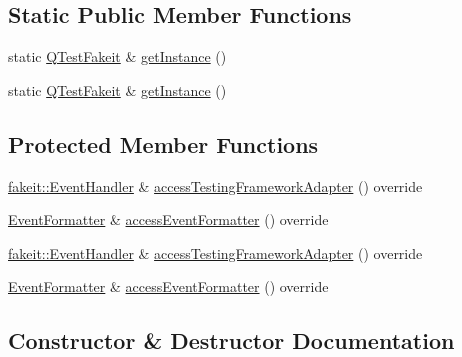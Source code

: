 \subsection*{Static Public Member Functions}
\begin{DoxyCompactItemize}
\item 
static \mbox{\hyperlink{classfakeit_1_1QTestFakeit}{Q\+Test\+Fakeit}} \& \mbox{\hyperlink{classfakeit_1_1QTestFakeit_a328295d6e8b037e88084a8cfd5a5795d}{get\+Instance}} ()
\item 
static \mbox{\hyperlink{classfakeit_1_1QTestFakeit}{Q\+Test\+Fakeit}} \& \mbox{\hyperlink{classfakeit_1_1QTestFakeit_a328295d6e8b037e88084a8cfd5a5795d}{get\+Instance}} ()
\end{DoxyCompactItemize}
\subsection*{Protected Member Functions}
\begin{DoxyCompactItemize}
\item 
\mbox{\hyperlink{structfakeit_1_1EventHandler}{fakeit\+::\+Event\+Handler}} \& \mbox{\hyperlink{classfakeit_1_1QTestFakeit_aee8ba80a302f34245af89d82e6a69b24}{access\+Testing\+Framework\+Adapter}} () override
\item 
\mbox{\hyperlink{structfakeit_1_1EventFormatter}{Event\+Formatter}} \& \mbox{\hyperlink{classfakeit_1_1QTestFakeit_a3760d57c61ed1572bcf5cded00f643ec}{access\+Event\+Formatter}} () override
\item 
\mbox{\hyperlink{structfakeit_1_1EventHandler}{fakeit\+::\+Event\+Handler}} \& \mbox{\hyperlink{classfakeit_1_1QTestFakeit_aee8ba80a302f34245af89d82e6a69b24}{access\+Testing\+Framework\+Adapter}} () override
\item 
\mbox{\hyperlink{structfakeit_1_1EventFormatter}{Event\+Formatter}} \& \mbox{\hyperlink{classfakeit_1_1QTestFakeit_a3760d57c61ed1572bcf5cded00f643ec}{access\+Event\+Formatter}} () override
\end{DoxyCompactItemize}


\subsection{Constructor \& Destructor Documentation}
\mbox{\label{classfakeit_1_1QTestFakeit_a9c1528d576211ff2ef24442cad8b3091}} 
